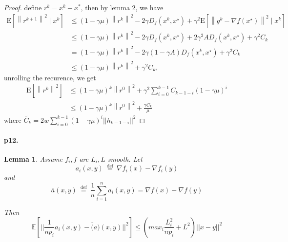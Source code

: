 \documentclass[8pt,a4paper]{article}
\newtheorem{lemma}{Lemma}
\newcommand{\E}{\mathbb{E}}
\begin{document}
	\begin{proof}
		define $r^k=x^k-x^*$, then by lemma 2, we have
		\begin{equation}
			\begin{aligned}
				\mathrm{E}\left[\left\|r^{k+1}\right\|^{2} \mid x^{k}\right] & \stackrel{}{\leq}(1-\gamma \mu)\left\|r^{k}\right\|^{2}-2 \gamma D_{f}\left(x^{k}, x^{\star}\right)+\gamma^{2} \mathrm{E}\left[\left\|g^{k}-\nabla f\left(x^{\star}\right)\right\|^{2} \mid x^{k}\right] \\
				& \stackrel{}{\leq}(1-\gamma \mu)\left\|r^{k}\right\|^{2}-2 \gamma D_{f}\left(x^{k}, x^{\star}\right)+2 \gamma^{2} A D_{f}\left(x^{k}, x^{\star}\right)+\gamma^{2} C_k \\
				&=(1-\gamma \mu)\left\|r^{k}\right\|^{2}-2 \gamma(1-\gamma A) D_{f}\left(x^{k}, x^{\star}\right)+\gamma^{2} C_k \\
				& \leq(1-\gamma \mu)\left\|r^{k}\right\|^{2}+\gamma^{2} C_k,
			\end{aligned}
		\end{equation}
	unrolling the recurence, we get
	\begin{equation}
		\begin{aligned}
			\mathrm{E}\left[\left\|r^{k}\right\|^{2}\right] & \leq(1-\gamma \mu)^{k}\left\|r^{0}\right\|^{2}+\gamma^{2}  \sum_{i=0}^{k-1}C_{k-1-i}(1-\gamma \mu)^{i} \\
			& \leq(1-\gamma \mu)^{k}\left\|r^{0}\right\|^{2}+\frac{\gamma \tilde{C_k}}{\mu}
		\end{aligned}
	\end{equation}
where $\tilde{C_k}=2w\sum_{i=0}^{k-1}(1-\gamma\mu)^i||h_{k-1-i}||^2$
	
	\end{proof}
	
	\paragraph{p12.}
	\begin{lemma}Assume $f_i,f$ are $L_i,L$ smooth.
		Let
		$$
		a_{i}(x, y) \stackrel{\text { def }}{=} \nabla f_{i}(x)-\nabla f_{i}(y)
		$$
		and
		$$
		\bar{a}(x, y) \stackrel{\text { def }}{=} \frac{1}{n} \sum_{i=1}^{n} a_{i}(x, y)=\nabla f(x)-\nabla f(y)
		$$
	
		Then
		\begin{equation*}
			\E[||\frac{1}{np_i}a_i(x,y)-\bar(a)(x,y)||^2]\leq (max_i\frac{L_i^2}{np_i}+L^2)||x-y||^2
		\end{equation*}
	\end{lemma}
\end{document}
